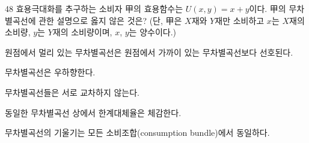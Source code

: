 \begin{question}{48}
효용극대화를 추구하는 소비자 甲의 효용함수는 $U(x,y)=x+y$이다. 甲의 무차별곡선에 관한 설명으로 옳지 않은 것은? (단, 甲은 $X$재와 $Y$재만 소비하고 $x$는 $X$재의 소비량, $y$는 $Y$재의 소비량이며, $x$, $y$는 양수이다.)
\begin{choices}
  \item 원점에서 멀리 있는 무차별곡선은 원점에서 가까이 있는 무차별곡선보다 선호된다.
  \item 무차별곡선은 우하향한다.
  \item 무차별곡선들은 서로 교차하지 않는다.
  \item 동일한 무차별곡선 상에서 한계대체율은 체감한다.
  \item 무차별곡선의 기울기는 모든 소비조합(consumption bundle)에서 동일하다.
\end{choices}
\end{question}
